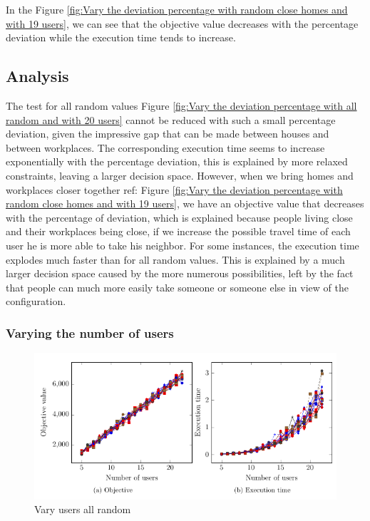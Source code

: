 \documentclass[12pt, a4paper, twoside]{memoir}
\begin{document}
{	In the Figure \ref{fig:Vary the deviation percentage with random close homes and with 19 users}, we can see that the objective value decreases with the percentage deviation while the execution time tends to increase.
	
	\subsection{Analysis}
	The test for all random values Figure \ref{fig:Vary the deviation percentage with all random and with 20 users} cannot be reduced with such a small percentage deviation, given the impressive gap that can be made between houses and between workplaces. The corresponding execution time seems to increase exponentially with the percentage deviation, this is explained by more relaxed constraints, leaving a larger decision space. \newline
	However, when we bring homes and workplaces closer together ref: Figure \ref{fig:Vary the deviation percentage with random close homes and with 19 users}, we have an objective value that decreases with the percentage of deviation, which is explained because people living close and their workplaces being close, if we increase the possible travel time of each user he is more able to take his neighbor. For some instances, the execution time explodes much faster than for all random values. This is explained by a much larger decision space caused by the more numerous possibilities, left by the fact that people can much more easily take someone or someone else in view of the configuration.
	
	\subsubsection{Varying the number of users}
	
	\begin{figure}[H]
		\centering
		\begin{flushleft}
			\includegraphics[scale=0.9]{img/compiledResults/12.png}
		\end{flushleft}
		\caption{Vary users all random}
		\label{fig:Vary users all random}
	\end{figure}
	
}
\end{document}
